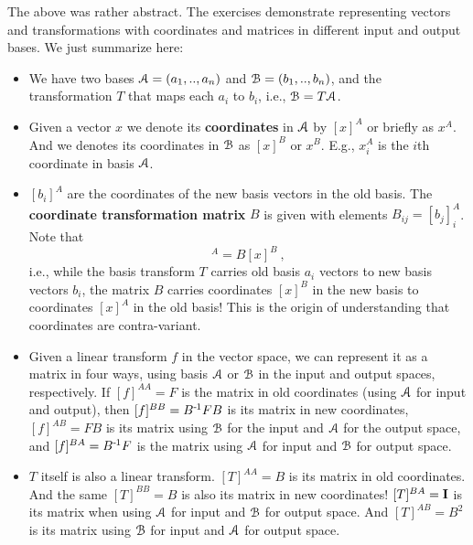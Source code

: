 The above was rather abstract. The exercises demonstrate representing vectors and transformations with coordinates and matrices
in different input and output bases. We just summarize here:
\begin{itemize}
\item We have two bases $\AA=(a_1,..,a_n)$ and $\BB=(b_1,..,b_n)$, and
  the transformation $T$ that maps each $a_i$ to $b_i$, i.e., $\BB = T
  \AA$.

\item Given a vector $x$ we denote its \textbf{coordinates} in $\AA$
  by $[x]^A$ or briefly as $x^A$. And we denotes its coordinates in
  $\BB$ as $[x]^B$ or $x^B$. E.g., $x^A_i$ is the $i$th coordinate in
  basis $\AA$.

\item $[b_i]^A$ are the coordinates of the new basis vectors in the
  old basis. The \textbf{coordinate transformation matrix} $B$ is
  given with elements $B_{ij} = [b_j]^A_i$. Note that
\begin{equation}
[x]^A = B
  [x]^B~,
\end{equation}
i.e., while the basis transform $T$ carries old basis $a_i$
  vectors to new basis vectors $b_i$, the matrix $B$ carries
  coordinates $[x]^B$ in the new basis to coordinates $[x]^A$ in the
  old basis! This is the origin of understanding that coordinates are
  contra-variant.

\item Given a linear transform $f$ in the vector space, we can
  represent it as a matrix in four ways, using basis $\AA$ or $\BB$ in
  the input and output spaces, respectively. If $[f]^{AA} = F$ is the matrix in
  old coordinates (using $\AA$ for input and output), then $[f]^{BB} = B^\1 F B$
  is its matrix in new coordinates, $[f]^{AB} = F B$ is its matrix using $\BB$
  for the input and $\AA$ for the output space, and $[f]^{BA} = B^\1 F$ is the
  matrix using $\AA$ for input and $\BB$ for output space.

\item $T$ itself is also a linear transform. $[T]^{AA} = B$ is its matrix in old
  coordinates. And the same $[T]^{BB} = B$ is also its matrix in new coordinates! $[T]^{BA} = \Id$ is its matrix when using
  $\AA$ for input and $\BB$ for output space. And $[T]^{AB} = B^2$ is its matrix
  using $\BB$ for input and $\AA$ for output space.
\end{itemize}









